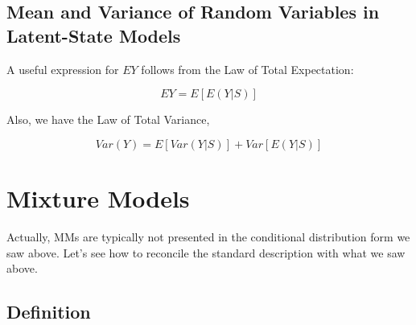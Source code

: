 \documentclass[11pt]{article}
\begin{document}
\subsection{Mean and Variance of Random Variables in Latent-State Models}
\label{mixmeanvar}

A useful expression for $EY$ follows from the Law of Total Expectation:

\begin{equation}
\label{mixmean}
EY = E[E(Y | S)]
\end{equation}

Also, we have the Law of Total Variance, 

\begin{equation}
\label{mixvar}
Var(Y) = E[Var(Y|S)] + Var[E(Y|S)]
\end{equation}

% 
% 
% 

\section{Mixture Models}

Actually, MMs are typically not presented in the conditional distribution
form we saw above.  Let's see how to reconcile the standard description
with what we saw above.

\subsection{Definition}
\label{mixdef}
\end{document}
